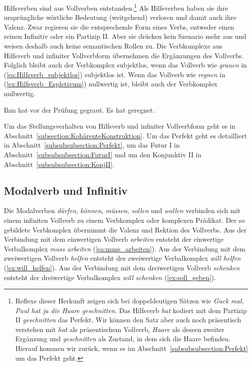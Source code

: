 Hilfsverben sind aus Vollverben entstanden.\footnote{Reflexe dieser Herkunft zeigen sich bei doppeldeutigen Sätzen wie \textit{Guck mal, Paul hat ja die Haare geschnitten}. Das Hilfsverb \textit{hat} kodiert mit dem Partizip II \textit{geschnitten} das Perfekt. Wir können den Satz aber auch noch präsentisch verstehen mit \textit{hat} als präsentischem Vollverb, \textit{Haare} als dessen zweiter Ergänzung und \textit{geschnitten} als Zustand, in dem sich die Haare befinden. Hierauf kommen wir zurück, wenn es im Abschnitt~\ref{subsubsubsection:Perfekt} um das Perfekt geht.} Als Hilfsverben haben sie ihre ursprüngliche wörtliche Bedeutung (weitgehend) verloren und damit auch ihre Valenz. Zwar regieren sie die entsprechende Form eines Verbs, entweder einen reinen Infinitiv oder ein Partizip II. Aber sie drücken kein Szenario mehr aus und weisen deshalb auch keine semantischen Rollen zu. Die Verbkomplexe aus Hilfsverb und infiniter Vollverbform übernehmen die Ergänzungen des Vollverbs. Folglich bleibt auch der Verbkomplex subjektlos, wenn das Vollverb wie \textit{grauen} in (\ref{ea:Hilfsverb_subjektlos}) subjektlos ist. Wenn das Vollverb wie \textit{regnen} in (\ref{ex:Hilfsverb_Espletivum}) nullwertig ist, bleibt auch der Verbkomplex nullwertig.

\ea \label{ea:Hilfsverb_Anhebung}
\ea \label{ea:Hilfsverb_subjektlos} Ihm hat vor der Prüfung gegraut.
\ex \label{ex:Hilfsverb_Espletivum} Es hat geregnet.
\z 
\z 


Um das Stellungsverhalten von Hilfsverb und infiniter Vollverbform geht es in Abschnitt~\ref{subsection:KohärenteKonstruktion}. Um das Perfekt geht es detailliert in Abschnitt~\ref{subsubsubsection:Perfekt}, um das Futur I in Abschnitt~\ref{subsubsubsection:FuturI} und um den Konjunktiv II in Abschnitt~\ref{subsubsubsection:KonjII}. 



\subsection{Modalverb und Infinitiv}\label{subsection:Modalverb_INF}

Die Modalverben \textit{dürfen}, \textit{können}, \textit{müssen}, \textit{sollen} und \textit{wollen} verbinden sich mit einem infiniten Vollverb zu einem Verbkomplex oder komplexen Prädikat. Der so gebildete Verbkomplex übernimmt die Valenz und Rektion des Vollverbs. Aus der Verbindung mit dem einwertigen Vollverb \textit{arbeiten} entsteht der einwertige Verbalkomplex \textit{muss arbeiten} (\ref{ea:muss_arbeiten}). Aus der Verbindung mit dem zweiwertigen Vollverb \textit{helfen} entsteht der zweiwertige Verbalkomplex \textit{will helfen} (\ref{ex:will_helfen}). Aus der Verbindung mit dem dreiwertigen Vollverb \textit{schenken} entsteht der dreiwertige Verbalkomplex \textit{will schenken} (\ref{ex:soll_geben}).

